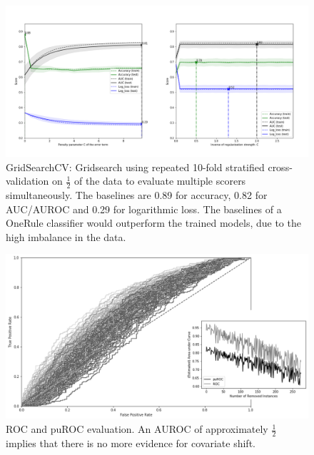 \begin{figure}[ht]
\centering
   \includegraphics[scale=0.38,angle=0]{fig/gridfigure}
\captionsetup{width= 400pt}
\caption{GridSearchCV: Gridsearch using repeated 10-fold stratified cross-validation on \(\frac{1}{2}\) of the data to evaluate multiple scorers simultaneously. The baselines are 0.89 for accuracy, 0.82 for AUC/AUROC and 0.29 for logarithmic loss. The baselines of a OneRule classifier would outperform the trained models, due to the high imbalance in the data.}
   \label{fig:Ng1} 
\end{figure}

\begin{figure}[ht]
\centering
   \includegraphics[scale=0.48,angle=0]{fig/res}
\captionsetup{width= 400pt}
\caption{ROC and puROC evaluation. An AUROC of approximately \(\frac{1}{2}\) implies that there is no more evidence for covariate shift.}
   \label{fig:Ng1} 
\end{figure}

